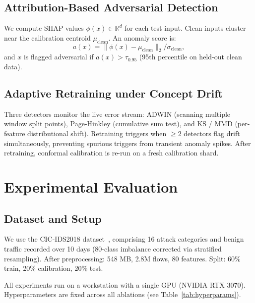 \documentclass[conference]{IEEEtran}
\begin{document}
\subsection{Attribution-Based Adversarial Detection}

We compute SHAP values $\phi(x) \in \mathbb{R}^d$ for each test input.
Clean inputs cluster near the calibration centroid $\mu_{\text{clean}}$.
An anomaly score is:
\begin{equation}
  a(x) = \|\phi(x) - \mu_{\text{clean}}\|_2 / \sigma_{\text{clean}},
\end{equation}
and $x$ is flagged adversarial if $a(x) > \tau_{0.95}$ (95th percentile
on held-out clean data).

\subsection{Adaptive Retraining under Concept Drift}

Three detectors monitor the live error stream:
ADWIN (scanning multiple window split points),
Page-Hinkley (cumulative sum test), and
KS / MMD (per-feature distributional shift).
Retraining triggers when $\ge 2$ detectors flag drift simultaneously,
preventing spurious triggers from transient anomaly spikes.
After retraining, conformal calibration is re-run on a fresh calibration shard.

\section{Experimental Evaluation}
\label{sec:experiments}

\subsection{Dataset and Setup}

We use the CIC-IDS2018 dataset~\cite{cicids2018}, comprising 16 attack
categories and benign traffic recorded over 10 days (80-class imbalance
corrected via stratified resampling). After preprocessing: 548 MB, 2.8M flows,
80 features. Split: 60\% train, 20\% calibration, 20\% test.

All experiments run on a workstation with a single GPU (NVIDIA RTX 3070).
Hyperparameters are fixed across all ablations (see Table~\ref{tab:hyperparams}).
\end{document}
